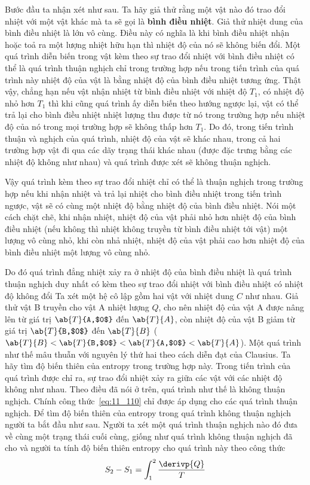 Bước đầu ta nhận xét như sau. Ta hãy giả thử rằng một vật nào đó trao đổi nhiệt với một vật khác mà ta sẽ gọi là \textbf{bình điều nhiệt}. Giả thử nhiệt dung của bình điều nhiệt là lớn vô cùng. Điều này có nghĩa là khi bình điều nhiệt nhận hoặc toả ra một lượng nhiệt hữu hạn thì nhiệt độ của nó sẽ không biến đổi. Một quá trình diễn biến trong vật kèm theo sự trao đổi nhiệt với bình điều nhiệt có thể là quá trình thuận nghịch chỉ trong trường hợp nếu trong tiến trình của quá trình này nhiệt độ của vật là bằng nhiệt độ của bình điều nhiệt tương ứng. Thật vậy, chẳng hạn nếu vật nhận nhiệt từ bình điều nhiệt với nhiệt độ $T_1$, có nhiệt độ nhỏ hơn $T_1$ thì khi cũng quá trình ấy diễn biến theo hướng ngược lại, vật có thể trả lại cho bình điều nhiệt nhiệt lượng thu được từ nó trong trường hợp nếu nhiệt độ của nó trong mọi trường hợp sẽ không thấp hơn $T_1$. Do đó, trong tiến trình thuận và nghịch của quá trình, nhiệt độ của vật sẽ khác nhau, trong cả hai trường hợp vật đi qua các dãy trạng thái khác nhau (được đặc trưng bằng các nhiệt độ không như nhau) và quá trình được xét sẽ không thuận nghịch.

Vậy quá trình kèm theo sự trao đổi nhiệt chỉ có thể là thuận nghịch trong trường hợp nếu khi nhận nhiệt và trả lại nhiệt cho bình điều nhiệt trong tiến trình ngược, vật sẽ có cùng một nhiệt độ bằng nhiệt độ của bình điều nhiệt. Nói một cách chặt chẽ, khi nhận nhiệt, nhiệt độ của vật phải nhỏ hơn nhiệt độ của bình điều nhiệt (nếu không thì nhiệt không truyền từ bình điều nhiệt tới vật) một lượng vô cùng nhỏ, khi còn nhả nhiệt, nhiệt độ của vật phải cao hơn nhiệt độ của bình điều nhiệt một lượng vô cùng nhỏ.

Do đó quá trình đẳng nhiệt xảy ra ở nhiệt độ của bình điều nhiệt là quá trình thuận nghịch duy nhất có kèm theo sự trao đổi nhiệt với bình điều nhiệt có nhiệt độ không đổi
Ta xét một hệ cô lập gồm hai vật với nhiệt dung $C$ như nhau. Giả thử vật B truyền cho vật A nhiệt lượng $Q$, cho nên nhiệt độ của vật A được nâng lên từ giá trị $\ab{T}{A,$0$}$ đến $\ab{T}{A}$, còn nhiệt độ của vật B giảm từ giá trị $\ab{T}{B,$0$}$ đến $\ab{T}{B}$ ($\ab{T}{B}<\ab{T}{B,$0$}<\ab{T}{A,$0$}<\ab{T}{A}$). Một quá trình như thế mâu thuẫn với nguyên lý thứ hai theo cách diễn đạt của Clausius. Ta hãy tìm độ biến thiên của entropy trong trường hợp này.
Trong tiến trình của quá trình được chỉ ra, sự trao đổi nhiệt xảy ra giữa các vật với các nhiệt độ không như nhau. Theo điều đã nói ở trên, quá trình như thế là không thuận nghịch. Chính công thức~\eqref{eq:11_110} chỉ được áp dụng cho các quá trình thuận nghịch. Để tìm độ biến thiên của entropy trong quá trình không thuận nghịch người ta bắt đầu như sau. Người ta xét một quá trình thuận nghịch nào đó đưa về cùng một trạng thái cuối cùng, giống như quá trình không thuận nghịch đã cho và người ta tính độ biến thiên entropy cho quá trình này theo công thức
\begin{equation}\label{eq:12_8}
	S_2 - S_1 = \int_{1}^{2} \frac{\derivp{Q}}{T}
\end{equation}

